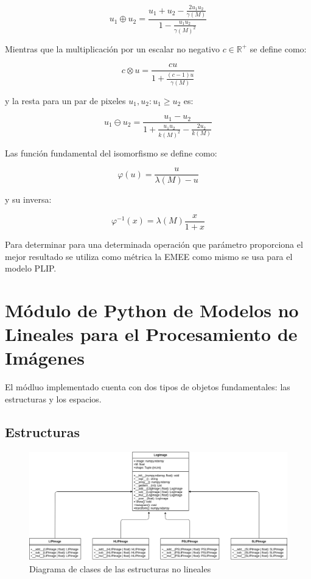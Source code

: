 \begin{equation}
	u_1\oplus u_2=\frac{u_1+u_2-\frac{2u_1u_2}{\gamma(M)}}{1-\frac{u_1u_2}{\gamma(M)^2}}
\end{equation}

Mientras que la multiplicaci\'on por un escalar no negativo $c\in\mathbb{R}^+$ se define como:

\begin{equation}
	c\otimes u=\frac{cu}{1+\frac{(c-1)u}{\gamma(M)}}
\end{equation}

y la resta para un par de pixeles $u_1,u_2:u_1\geq u_2$ es:

\begin{equation}
	u_1\ominus u_2=\frac{u_1-u_2}{1+\frac{u_1u_2}{k(M)^2}-\frac{2u_2}{k(M)}}
\end{equation}

Las funci\'on fundamental del isomorfismo se define como:

\begin{equation}
	\varphi(u)=\frac{u}{\lambda(M)-u}
\end{equation}

y su inversa:

\begin{equation}
	\varphi^{-1}(x)=\lambda(M)\frac{x}{1+x}
\end{equation}

Para determinar para una determinada operaci\'on que par\'ametro proporciona el mejor resultado se utiliza como m\'etrica la EMEE como mismo se usa para el modelo PLIP.

\section{M\'odulo de Python de Modelos no Lineales para el Procesamiento de Im\'agenes}

El m\'odluo implementado cuenta con dos tipos de objetos fundamentales: las estructuras y los espacios.

\subsection{Estructuras}

\begin{figure}
	\begin{center}
		\includegraphics[width=16.0 cm]{images/structures_class_diagram.png}
		\caption{Diagrama de clases de las estructuras no lineales}
	\end{center}
\end{figure}

